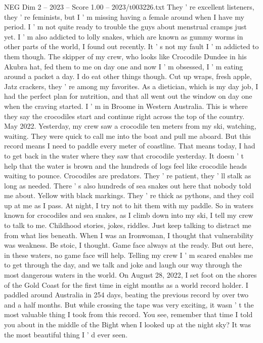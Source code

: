 \begin{textsample}{NEG Dim 2 – 2023 – Score 1.00 – 2023/t003226.txt}
They ' re excellent listeners, they ' re feminists, but I ' m missing having a female around when I have my period.
I ' m not quite ready to trouble the guys about menstrual cramps just yet.
I ' m also addicted to lolly snakes, which are known as gummy worms in other parts of the world, I found out recently.
It ' s not my fault I ' m addicted to them though.
The skipper of my crew, who looks like Crocodile Dundee in his Akubra hat, fed them to me on day one and now I ' m obsessed, I ' m eating around a packet a day.
I do eat other things though.
Cut up wraps, fresh apple, Jatz crackers, they ' re among my favorites.
As a dietician, which is my day job, I had the perfect plan for nutrition, and that all went out the window on day one when the craving started.
I ' m in Broome in Western Australia.
This is where they say the crocodiles start and continue right across the top of the country.
May 2022.
Yesterday, my crew saw a crocodile ten meters from my ski, watching, waiting.
They were quick to call me into the boat and pull me aboard.
But this record means I need to paddle every meter of coastline.
That means today, I had to get back in the water where they saw that crocodile yesterday.
It doesn ' t help that the water is brown and the hundreds of logs feel like crocodile heads waiting to pounce.
Crocodiles are predators.
They ' re patient, they ' ll stalk as long as needed.
There ' s also hundreds of sea snakes out here that nobody told me about.
Yellow with black markings.
They ' re thick as pythons, and they coil up at me as I pass.
At night, I try not to hit them with my paddle.
So in waters known for crocodiles and sea snakes, as I climb down into my ski, I tell my crew to talk to me.
Childhood stories, jokes, riddles.
Just keep talking to distract me from what lies beneath.
When I was an Ironwoman, I thought that vulnerability was weakness.
Be stoic, I thought.
Game face always at the ready.
But out here, in these waters, no game face will help.
Telling my crew I ' m scared enables me to get through the day, and we talk and joke and laugh our way through the most dangerous waters in the world.
On August 28, 2022, I set foot on the shores of the Gold Coast for the first time in eight months as a world record holder.
I paddled around Australia in 254 days, beating the previous record by over two and a half months.
But while crossing the tape was very exciting, it wasn ' t the most valuable thing I took from this record.
You see, remember that time I told you about in the middle of the Bight when I looked up at the night sky?
It was the most beautiful thing I ' d ever seen.

\end{textsample}
